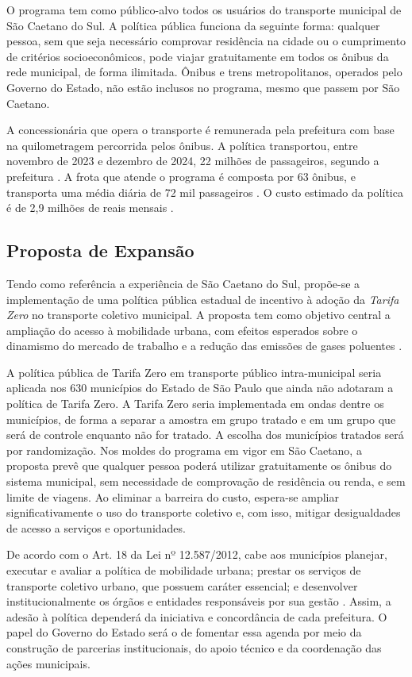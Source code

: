 O programa tem como público-alvo todos os usuários do transporte municipal de São Caetano do Sul. A política pública funciona da seguinte forma: qualquer pessoa, sem que seja necessário comprovar residência na cidade ou o cumprimento de critérios socioeconômicos, pode viajar gratuitamente em todos os ônibus da rede municipal, de forma ilimitada. Ônibus e trens metropolitanos, operados pelo Governo do Estado, não estão inclusos no programa, mesmo que passem por São Caetano.

A concessionária que opera o transporte é remunerada pela prefeitura com base na quilometragem percorrida pelos ônibus. A política transportou, entre novembro de 2023 e dezembro de 2024, 22 milhões de passageiros, segundo a prefeitura \cite{PREF_2024}. A frota que atende o programa é composta por 63 ônibus, e transporta uma média diária de 72 mil passageiros \cite{PREF_2023}. O custo estimado da política é de 2{,}9 milhões de reais mensais \cite{LEI_PROG}.

\subsection{Proposta de Expansão}

Tendo como referência a experiência de São Caetano do Sul, propõe-se a implementação de uma política pública estadual de incentivo à adoção da \textit{Tarifa Zero} no transporte coletivo municipal. A proposta tem como objetivo central a ampliação do acesso à mobilidade urbana, com efeitos esperados sobre o dinamismo do mercado de trabalho e a redução das emissões de gases poluentes \cite{BETTER_FIRMS, NO_DAM, PREF_2024}.

A política pública de Tarifa Zero em transporte público intra-municipal seria aplicada nos 630 municípios do Estado de São Paulo que ainda não adotaram a política de Tarifa Zero. A  Tarifa Zero seria implementada em ondas dentre os municípios, de forma a separar a amostra em grupo tratado e em um grupo que será de controle enquanto não for tratado. A escolha dos municípios tratados será por randomização.
Nos moldes do programa em vigor em São Caetano, a proposta prevê que qualquer pessoa poderá utilizar gratuitamente os ônibus do sistema municipal, sem necessidade de comprovação de residência ou renda, e sem limite de viagens. Ao eliminar a barreira do custo, espera-se ampliar significativamente o uso do transporte coletivo e, com isso, mitigar desigualdades de acesso a serviços e oportunidades.

De acordo com o Art. 18 da Lei nº 12.587/2012, cabe aos municípios planejar, executar e avaliar a política de mobilidade urbana; prestar os serviços de transporte coletivo urbano, que possuem caráter essencial; e desenvolver institucionalmente os órgãos e entidades responsáveis por sua gestão \cite{lei12587}. Assim, a adesão à política dependerá da iniciativa e concordância de cada prefeitura. O papel do Governo do Estado será o de fomentar essa agenda por meio da construção de parcerias institucionais, do apoio técnico e da coordenação das ações municipais.

